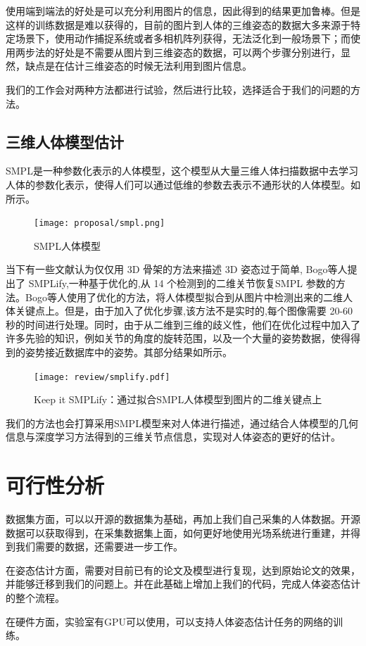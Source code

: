 使用端到端法的好处是可以充分利用图片的信息，因此得到的结果更加鲁棒。但是这样的训练数据是难以获得的，目前的图片到人体的三维姿态的数据大多来源于特定场景下，使用动作捕捉系统或者多相机阵列获得，无法泛化到一般场景下；而使用两步法的好处是不需要从图片到三维姿态的数据，可以两个步骤分别进行，显然，缺点是在估计三维姿态的时候无法利用到图片信息。

我们的工作会对两种方法都进行试验，然后进行比较，选择适合于我们的问题的方法。

\subsection{三维人体模型估计}
SMPL\autocite{loper2015smpl}是一种参数化表示的人体模型，这个模型从大量三维人体扫描数据中去学习人体的参数化表示，使得人们可以通过低维的参数去表示不通形状的人体模型。如所示。
\begin{figure}[ht]
    \centering
    \texttt{[image: proposal/smpl.png]}
    \caption{SMPL\autocite{loper2015smpl}人体模型}\label{fig:smpl0}
\end{figure}
当下有一些文献认为仅仅用 3D 骨架的方法来描述 3D 姿态过于简单, Bogo等人\cite{bogo2016keep}提出了 SMPLify,一种基于优化的,从 14 个检测到的二维关节恢复SMPL 参数的方法。Bogo等人\cite{bogo2016keep}使用了优化的方法，将人体模型拟合到从图片中检测出来的二维人体关键点上。但是，由于加入了优化步骤,该方法不是实时的,每个图像需要 20-60 秒的时间进行处理。同时，由于从二维到三维的歧义性，他们在优化过程中加入了许多先验的知识，例如关节的角度的旋转范围，以及一个大量的姿势数据，使得得到的姿势接近数据库中的姿势。其部分结果如所示。 

\begin{figure}[ht]
    \centering
    \texttt{[image: review/smplify.pdf]}
    \caption{Keep it SMPLify\autocite{bogo2016keep}：通过拟合SMPL人体模型到图片的二维关键点上}\label{fig:smpl}
\end{figure}

我们的方法也会打算采用SMPL模型来对人体进行描述，通过结合人体模型的几何信息与深度学习方法得到的三维关节点信息，实现对人体姿态的更好的估计。

\section{可行性分析}
数据集方面，可以以开源的数据集为基础，再加上我们自己采集的人体数据。开源数据可以获取得到，在采集数据集上面，如何更好地使用光场系统进行重建，并得到我们需要的数据，还需要进一步工作。

在姿态估计方面，需要对目前已有的论文及模型进行复现，达到原始论文的效果，并能够迁移到我们的问题上。并在此基础上增加上我们的代码，完成人体姿态估计的整个流程。

在硬件方面，实验室有GPU可以使用，可以支持人体姿态估计任务的网络的训练。
